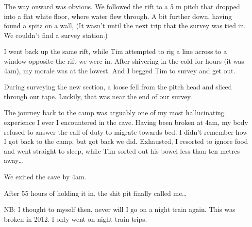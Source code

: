 The way onward was obvious. We followed the rift to a 5 m pitch that
dropped into a flat white floor, where water flew through. A bit further
down, having found a spitz on a wall,  (It wasn't until the next trip that the survey was tied in.
We couldn't find a survey station.)

I went back up the same rift, while Tim attempted to rig a line across
to a window opposite the rift we were in. After shivering in the cold
for hours (it was 4am), my morale was at the lowest. And I begged Tim to
survey and get out.

During surveying the new section, a loose fell from the pitch head and
sliced through our tape. Luckily, that was near the end of our survey.

The journey back to the camp was arguably one of my most hallucinating
experience I ever I encountered in the cave. Having been broken at 4am,
my body refused to answer the call of duty to migrate towards bed. I
didn't remember how I got back to the camp, but got back we did.
Exhausted, I resorted to ignore food and went straight to sleep, while
Tim sorted out his bowel less than ten metres away\ldots{}


We exited the cave by 4am.

After 55 hours of holding it in, the shit pit finally called me\ldots{}

NB: I thought to myself then, never will I go on a night train again.
This was broken in 2012. I only went on night train trips.



